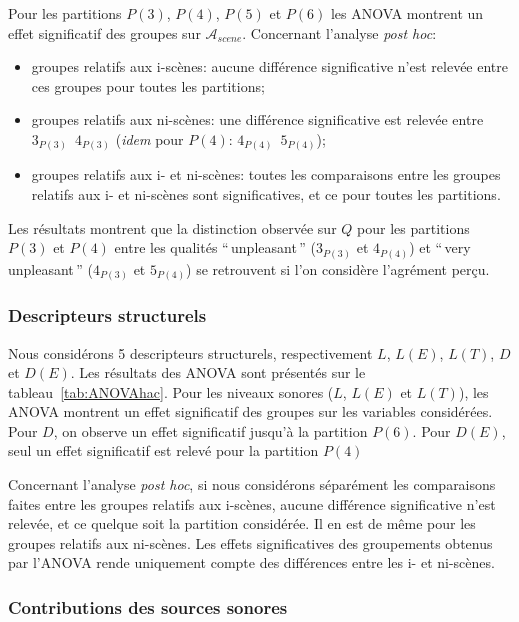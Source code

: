 Pour les partitions $P(3)$, $P(4)$, $P(5)$ et $P(6)$ les ANOVA montrent un effet significatif des groupes sur $\mathcal{A}_{scene}$. Concernant l'analyse \emph{post hoc}:

\begin{itemize}
\item groupes relatifs aux i-scènes: aucune différence significative n'est relevée entre ces groupes pour toutes les partitions;
\item groupes relatifs aux ni-scènes: une différence significative est relevée entre $3_{P(3)}$~\vs $4_{P(3)}$ (\emph{idem} pour $P(4)$: $4_{P(4)}$~\vs $5_{P(4)}$); 
\item groupes relatifs aux i- et ni-scènes: toutes les comparaisons entre les groupes relatifs aux i- et ni-scènes sont significatives, et ce pour toutes les partitions. 
\end{itemize}

Les résultats montrent que la distinction observée sur $Q$ pour les partitions $P(3)$ et $P(4)$ entre les qualités ``\,unpleasant\,'' ($3_{P(3)}$ et $4_{P(4)}$) et ``\,very unpleasant\,'' ($4_{P(3)}$ et $5_{P(4)}$) se retrouvent si l'on considère l'agrément perçu. \\


\subsubsection{Descripteurs structurels}

Nous considérons 5 descripteurs structurels, respectivement $L$, $L(E)$, $L(T)$, $D$ et $D(E)$. Les résultats des ANOVA sont présentés sur le tableau~\ref{tab:ANOVAhac}. Pour les niveaux sonores ($L$, $L(E)$ et $L(T)$), les ANOVA montrent un effet significatif des groupes sur les variables considérées. Pour $D$, on observe un effet significatif jusqu’à la partition $P(6)$. Pour $D(E)$, seul un effet significatif est relevé pour la partition $P(4)$

Concernant l'analyse \emph{post hoc}, si nous considérons séparément les comparaisons faites entre les groupes relatifs aux i-scènes, aucune différence significative n'est relevée, et ce quelque soit la partition considérée. Il en est de même pour les groupes relatifs aux ni-scènes. Les effets significatives des groupements obtenus par l'ANOVA rende uniquement compte des différences entre les i- et ni-scènes.

\subsubsection{Contributions des sources sonores}

